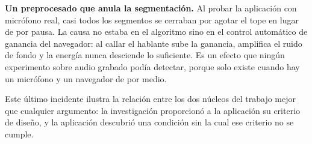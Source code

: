 \textbf{Un preprocesado que anula la segmentación.} Al probar la aplicación con micrófono
real, casi todos los segmentos se cerraban por agotar el tope en lugar de por pausa. La
causa no estaba en el algoritmo sino en el control automático de ganancia del navegador:
al callar el hablante sube la ganancia, amplifica el ruido de fondo y la energía nunca
desciende lo suficiente. Es un efecto que ningún experimento sobre audio grabado podía
detectar, porque solo existe cuando hay un micrófono y un navegador de por medio.

Este último incidente ilustra la relación entre los dos núcleos del trabajo mejor que
cualquier argumento: la investigación proporcionó a la aplicación su criterio de diseño,
y la aplicación descubrió una condición sin la cual ese criterio no se cumple.
